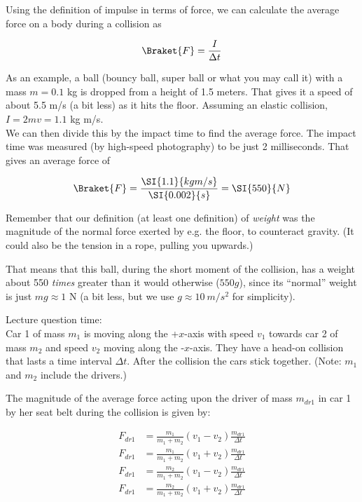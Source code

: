 Using the definition of impulse in terms of force, we can calculate the average force on a body during a collision as

\begin{equation}
\Braket{F} = \frac{I}{\Delta t}
\end{equation}

As an example, a ball (bouncy ball, super ball or what you may call it) with a mass $m = 0.1$ kg is dropped from a height of 1.5 meters. That gives it a speed of about 5.5 m/s (a bit less) as it hits the floor. Assuming an elastic collision, $I = 2 m v = 1.1$ kg m/s.\\
We can then divide this by the impact time to find the average force. The impact time was measured (by high-speed photography) to be just 2 milliseconds. That gives an average force of

\begin{equation}
\Braket{F} = \frac{\SI{1.1}{kg m/s}}{\SI{0.002}{s}} = \SI{550}{N}
\end{equation}

Remember that our definition (at least one definition) of \emph{weight} was the magnitude of the normal force exerted by e.g. the floor, to counteract gravity. (It could also be the tension in a rope, pulling you upwards.)

That means that this ball, during the short moment of the collision, has a weight about 550 \emph{times} greater than it would otherwise ($550 g$), since its ``normal'' weight is just $m g \approx 1$ N (a bit less, but we use $g \approx \SI{10}{m/s^2}$ for simplicity).

Lecture question time:\\
Car 1 of mass $m_1$ is moving along the +$x$-axis with speed $v_1$ towards car 2 of mass $m_2$ and speed $v_2$ moving along the -$x$-axis. They have a head-on collision that lasts a time interval $\Delta t$. After the collision the cars stick together. (Note: $m_1$ and $m_2$ include the drivers.)

The magnitude of the average force acting upon the driver of mass $m_{dr1}$ in car 1 by her seat belt during the collision is given by:

\begin{align}
F_{dr1} &= \frac{m_1}{m_1 + m_2} (v_1 - v_2) \frac{m_{dr1}}{\Delta t}\\
F_{dr1} &= \frac{m_1}{m_1 + m_2} (v_1 + v_2) \frac{m_{dr1}}{\Delta t}\\
F_{dr1} &= \frac{m_2}{m_1 + m_2} (v_1 - v_2) \frac{m_{dr1}}{\Delta t}\\
F_{dr1} &= \frac{m_2}{m_1 + m_2} (v_1 + v_2) \frac{m_{dr1}}{\Delta t}
\end{align}

